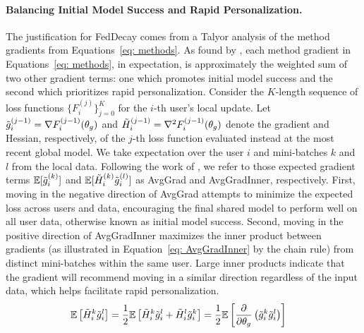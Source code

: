 \paragraph{Balancing Initial Model Success and Rapid Personalization.}
The justification for FedDecay comes from a Talyor analysis of the method gradients from Equations~\ref{eq: methods}. 
As found by \citet{reptile}, each method gradient in Equations~\ref{eq: methods}, in expectation, is approximately the weighted sum of two other gradient terms: one which promotes initial model success and the second which prioritizes rapid personalization. 
Consider the $K$-length sequence of loss functions $\{ F_i^{(j)} \}_{j = 0}^K$ for the $i$-th user's local update. 
Let $\Tilde{g}_i^{(j - 1)} = \nabla F_i^{(j - 1)} (\theta_g)$  and $\Tilde{H}_i^{(j - 1)} = \nabla^2 F_i^{(j - 1)} (\theta_g)$ denote the gradient and Hessian, respectively, of the $j$-th loss function evaluated instead at the most recent global model.
We take expectation over the user $i$ and mini-batches $k$ and $l$ from the local data. 
Following the work of \citet{reptile}, we refer to those expected gradient terms $\mathbb{E} \mathopen[ \Tilde{g}_i^{(k)} \mathclose]$ and $\mathbb{E} \mathopen[ \Tilde{H}_i^{(k)} \Tilde{g}_i^{(l)} \mathclose]$ as AvgGrad and AvgGradInner, respectively. 
First, moving in the negative direction of AvgGrad attempts to minimize the expected loss across users and data, encouraging the final shared model to perform well on all user data, otherwise known as initial model success. 
Second, moving in the positive direction of AvgGradInner maximizes the inner product between gradients (as illustrated in Equation~\ref{eq: AvgGradInner} by the chain rule) from distinct mini-batches within the same user.
Large inner products indicate that the gradient will recommend moving in a similar direction regardless of the input data, which helps facilitate rapid personalization.
\begin{align}
    & \mathbb{E} \left[ \Tilde{H}_i^k \Tilde{g}_i^l \right] 
        = \frac{1}{2} \mathbb{E}\left[ \Tilde{H}_i^k \Tilde{g}_i^l + \Tilde{H}_i^l \Tilde{g}_i^k \right] 
        = \frac{1}{2} \mathbb{E}\left[ \frac{\partial}{\partial \theta_g} \left( \Tilde{g}_i^k \Tilde{g}_i^l \right) \right] \label{eq: AvgGradInner}
\end{align}

